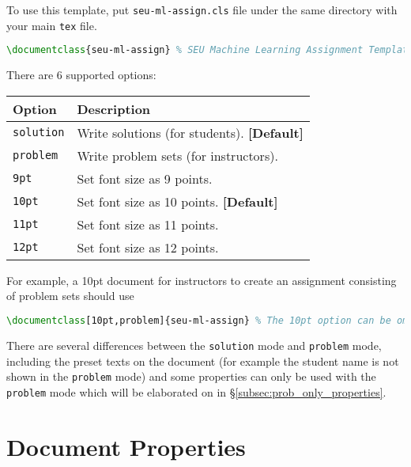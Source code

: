 \documentclass{seu-ml-assign}
\newcommand{\grayrow}{\rowcolor[rgb]{ .906,  .902,  .902}}
\begin{document}
    To use this template, put \texttt{seu-ml-assign.cls} file under the same directory with your main \texttt{tex} file.
    \begin{lstlisting}[language=tex,numbers=none]
\documentclass{seu-ml-assign} % SEU Machine Learning Assignment Template
    \end{lstlisting}
    There are 6 supported options:
    \begin{table}[htbp]
      \bgroup
        \def\arraystretch{1.2}
        \setlength{\tabcolsep}{1.5em}
        \begin{tabular}{ll}
          \toprule
          \textbf{Option} & \textbf{Description} \\
          \midrule\midrule
          \grayrow \texttt{solution} & Write solutions (for students). \textbf{[Default]} \\
          \texttt{problem} & Write problem sets (for instructors). \\
          \grayrow \texttt{9pt} & Set font size as 9 points. \\
          \texttt{10pt} & Set font size as 10 points. \textbf{[Default]} \\
          \grayrow \texttt{11pt} & Set font size as 11 points. \\
          \texttt{12pt} & Set font size as 12 points. \\
        \bottomrule
      \end{tabular}%
      \egroup
    \end{table}

    For example, a 10pt document for instructors to create an assignment consisting of problem sets should use

    \begin{lstlisting}[language=tex,numbers=none]
\documentclass[10pt,problem]{seu-ml-assign} % The 10pt option can be omitted.
    \end{lstlisting}

    There are several differences between the \texttt{solution} mode and \texttt{problem} mode,
    including the preset texts on the document (for example the student name is not shown in the \texttt{problem} mode) and some properties can only be used with the \texttt{problem} mode which will be elaborated on in \S\ref{subsec:prob_only_properties}.

  \section{Document Properties}
\end{document}
